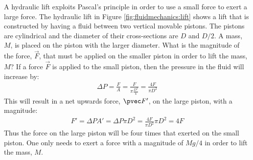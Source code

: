 \begin{example}{
A hydraulic lift exploits Pascal's principle in order to use a small force to exert a large force. The hydraulic lift in Figure \ref{fig:fluidmechanics:lift} shows a lift that is constructed by having a fluid between two vertical movable pistons. The pistons are cylindrical and the diameter of their cross-sections are $D$ and $D/2$. A mass, $M$, is placed on the piston with the larger diameter. What is the magnitude of the force, $\vec F$, that must be applied on the smaller piston in order to lift the mass, $M$?}
If a force $\vec F$ is applied to the small piston, then the pressure in the fluid will increase by:
\begin{align*}
\Delta P = \frac{F}{A}=\frac{F}{\pi \frac{D^2}{4}}=\frac{4F}{\pi D^2}
\end{align*}
This will result in a net upwards force, $\pvec F'$, on the large piston, with a magnitude:
\begin{align*}
F' = \Delta P A' = \Delta P \pi D^2 = \frac{4F}{\pi D^2} \pi D^2 = 4F
\end{align*}
Thus the force on the large piston will be four times that exerted on the small piston. One only needs to exert a force with a magnitude of $Mg/4$ in order to lift the mass, $M$.
\end{example}

